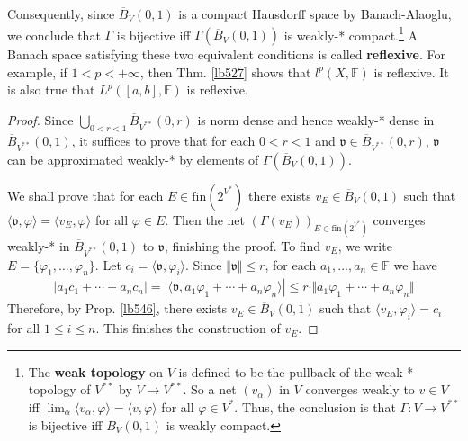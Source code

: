 \documentclass[12pt,b5paper,notitlepage]{article}
\theoremstyle{definition}
\newtheorem{rem}[df]{Remark}
\theoremstyle{plain}
\newcommand{\fk}{\mathfrak}
\newcommand{\ovl}{\overline}
\newcommand{\bk}[1]{\langle {#1}\rangle}
\newcommand{\fin}{\mathrm{fin}}
\newcommand{\Fbb}{\mathbb F}
\newcommand{\eps}{\varepsilon}
\numberwithin{equation}{section}
\begin{document}
Consequently, since $\ovl B_V(0,1)$ is a compact Hausdorff space by Banach-Alaoglu, we conclude that $\Gamma$ is bijective iff $\Gamma(\ovl B_V(0,1))$ is weakly-* compact.\footnote{The \textbf{weak topology}  on $V$ is defined to be the pullback of the weak-* topology of $V^{**}$ by $V\rightarrow V^{**}$. So a net $(v_\alpha)$ in $V$ converges weakly to $v\in V$ iff $\lim_\alpha\bk{v_\alpha,\varphi}=\bk{v,\varphi}$ for all $\varphi\in V^*$. Thus, the conclusion is that $\Gamma:V\rightarrow V^{**}$ is bijective iff $\ovl B_V(0,1)$ is weakly compact.} A Banach space satisfying these two equivalent conditions is called \textbf{reflexive}.  For example, if $1<p<+\infty$, then Thm. \ref{lb527} shows that $l^p(X,\Fbb)$ is reflexive. It is also true that $L^p([a,b],\Fbb)$ is reflexive.

\begin{proof}
Since $\bigcup_{0<r<1}\ovl B_{V^{**}}(0,r)$ is norm dense and hence weakly-* dense in  $\ovl B_{V^{**}}(0,1)$, it suffices to prove that for each $0<r<1$ and $\fk v\in\ovl B_{V^{**}}(0,r) $, $\fk v$ can be approximated weakly-* by elements of $\Gamma(\ovl B_V(0,1))$.

We shall prove that for each $E\in\fin(2^{V^*})$ there exists $v_E\in \ovl B_V(0,1)$ such that $\bk{\fk v,\varphi}=\bk{v_E,\varphi}$ for all $\varphi\in E$. Then the net $(\Gamma(v_E))_{E\in\fin(2^{V^*})}$ converges weakly-* in $\ovl B_{V^{**}}(0,1)$ to $\fk v$, finishing the proof. To find $v_E$, we write $E=\{\varphi_1,\dots,\varphi_n\}$. Let $c_i=\bk{\fk v,\varphi_i}$. Since $\Vert\fk v\Vert\leq r$, for each $a_1,\dots,a_n\in\Fbb$ we have
\begin{align*}
|a_1c_1+\cdots+a_nc_n|=|\bk{\fk v,a_1\varphi_1+\cdots+a_n\varphi_n}|\leq r\cdot\Vert a_1\varphi_1+\cdots+a_n\varphi_n\Vert
\end{align*}
Therefore, by Prop. \ref{lb546}, there exists $v_E\in \ovl B_V(0,1)$ such that $\bk{v_E,\varphi_i}=c_i$ for all $1\leq i\leq n$. This finishes the construction of $v_E$. 
\end{proof}


\begin{comment}
\begin{rem}
We will show in Exe. \ref{lb562} that if $V$ is reflexive and $U$ its closed linear subspace, then for each $v\in V$ there exists $u\in U$ minimizing $\Vert v+u\Vert$.  It follows immediately from Pb. \ref{lb547} that in Prop. \ref{lb546} one can choose $v\in V$ satisfying $\Vert v\Vert\leq M$ (but not just $\Vert v\Vert\leq M+\eps$) and \eqref{eq213}. Since $L^p(I)$ is reflexive (when $1<p<+\infty$), we thus have an explanation of why in Rem. \ref{lb552} one can choose $f_n$ satisfying $\Vert f\Vert_{L^p}\leq M$ and \eqref{eq215}.
\end{rem}
\end{comment}
\end{document}
